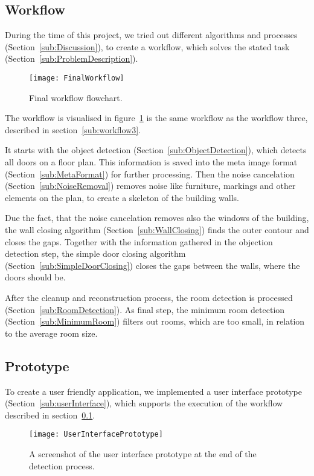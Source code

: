 \subsection{Workflow}
\label{sub:FinalWorkflow}
During the time of this project, we tried out different algorithms and processes (Section~\ref{sub:Discussion}), to create a workflow, which solves the stated task (Section~\ref{sub:ProblemDescription}).

\begin{figure}[H]
	\centering
	\texttt{[image: FinalWorkflow]}
	\caption{Final workflow flowchart.}
	\label{fig:FinalWorkflow}
\end{figure}

The workflow is visualised in figure~\ref{fig:FinalWorkflow} is the same workflow as the workflow three, described in section~\ref{sub:workflow3}.

It starts with the object detection (Section~\ref{sub:ObjectDetection}), which detects all doors on a floor plan. This information is saved into the meta image format (Section~\ref{sub:MetaFormat}) for further processing. Then the noise cancelation (Section~\ref{sub:NoiseRemoval}) removes noise like furniture, markings and other elements on the plan, to create a skeleton of the building walls.

Due the fact, that the noise cancelation removes also the windows of the building, the wall closing algorithm (Section~\ref{sub:WallClosing}) finds the outer contour and closes the gaps. Together with the information gathered in the objection detection step, the simple door closing algorithm (Section~\ref{sub:SimpleDoorClosing}) closes the gaps between the walls, where the doors should be.

After the cleanup and reconstruction process, the room detection is processed (Section~\ref{sub:RoomDetection}). As final step, the minimum room detection (Section~\ref{sub:MinimumRoom}) filters out rooms, which are too small, in relation to the average room size.


\subsection{Prototype}
To create a user friendly application, we implemented a user interface prototype (Section~\ref{sub:userInterface}), which supports the execution of the workflow described in section~\ref{sub:FinalWorkflow}.

\begin{figure}[H]
	\centering
	\texttt{[image: UserInterfacePrototype]}
	\caption{A screenshot of the user interface prototype at the end of the detection process.}
	\label{fig:UserInterfacePrototype}
\end{figure}

